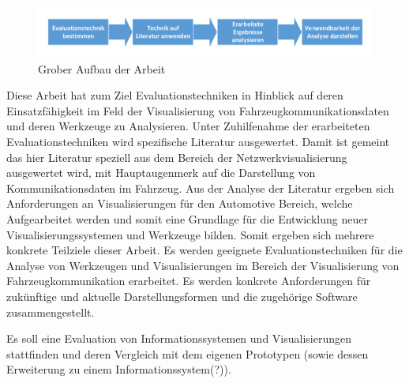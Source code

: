 \documentclass[draft=false
              ,paper=a4
              ,twoside=false
              ,fontsize=11pt
              ,headsepline
              ,BCOR10mm
              ,DIV11
              ]{scrbook}
\begin{document}
\begin{figure}[htbp]
  \centering
  \includegraphics[width=\textwidth]{img/Aufbau_grob.pdf}
  \caption{Grober Aufbau der Arbeit}
  \label{fig:aufbaugrob}
\end{figure}





Diese Arbeit hat zum Ziel Evaluationstechniken in Hinblick auf deren Einsatzfähigkeit im Feld der Visualisierung von Fahrzeugkommunikationsdaten und deren Werkzeuge zu Analysieren. Unter Zuhilfenahme der erarbeiteten Evaluationstechniken wird spezifische Literatur ausgewertet. Damit ist gemeint das hier Literatur speziell aus dem Bereich der Netzwerkvisualisierung ausgewertet wird, mit Hauptaugenmerk auf die Darstellung von Kommunikationsdaten im Fahrzeug. Aus der Analyse der Literatur ergeben sich Anforderungen an Visualisierungen für den Automotive Bereich, welche Aufgearbeitet werden und somit eine Grundlage für die Entwicklung neuer Visualisierungssystemen und Werkzeuge bilden. 
Somit ergeben sich mehrere konkrete Teilziele dieser Arbeit. Es werden geeignete Evaluationstechniken für die Analyse von Werkzeugen und Visualisierungen im Bereich der Visualisierung von Fahrzeugkommunikation erarbeitet. Es werden konkrete Anforderungen für zukünftige und aktuelle Darstellungsformen und die zugehörige Software zusammengestellt.


Es soll eine Evaluation von Informationssystemen und Visualisierungen stattfinden und deren Vergleich mit dem eigenen Prototypen (sowie dessen Erweiterung zu einem Informationssystem(?)). 
\end{document}
